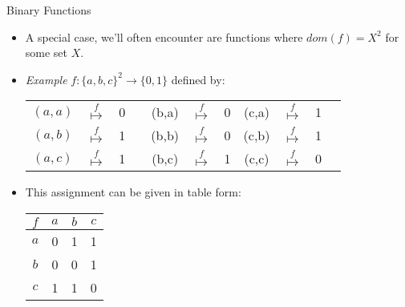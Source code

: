 \documentclass[../slides.tex]{subfiles}
\begin{document}
\begin{frame}{Binary Functions}

	\begin{itemize}
	
		\item A special case, we'll often encounter are functions where $dom(f)=X^2$ for some set $X$.
		
		\item \emph{Example} $f:\{a,b,c\}^2\to \{0,1\}$ defined by:
		
		\begin{center}
	\begin{tabular}{c c c c c c c c c c c}
	$(a,a)$ & $\overset{f}{\mapsto}$ & 0 & \quad & (b,a) & $\overset{f}{\mapsto}$ & 0  \quad & (c,a) & $\overset{f}{\mapsto}$ & 1\\

	$(a,b)$ & $\overset{f}{\mapsto}$ & 1 & \quad & (b,b) & $\overset{f}{\mapsto}$ & 0  \quad & (c,b) & $\overset{f}{\mapsto}$ & 1\\


	$(a,c)$ & $\overset{f}{\mapsto}$ & 1 & \quad & (b,c) & $\overset{f}{\mapsto}$ & 1  \quad & (c,c) & $\overset{f}{\mapsto}$ & 0\\


	\end{tabular}
\end{center}

	\item This assignment can be given in table form:

\begin{center}
	\begin{tabular}{ c | c c c}
	$f$ & $a$ & $b$ & $c$ \\ \hline
	
	$a$ & 0 & 1 & 1\\
	
	$b$ & 0 & 0 & 1\\
	
	$c$ & 1 & 1 & 0
	
	\end{tabular} 
	
\end{center}
	
	\end{itemize}

\end{frame}
\end{document}
